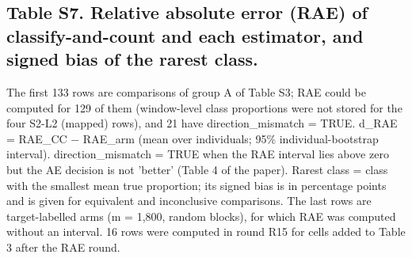 \documentclass[10pt,a4paper]{article}
\begin{document}
\subsection*{Table S7. Relative absolute error (RAE) of classify-and-count and each estimator, and signed bias of the rarest class.}
{\footnotesize The first 133 rows are comparisons of group A of Table S3; RAE could be computed for 129 of them (window-level class proportions were not stored for the four S2-L2 (mapped) rows), and 21 have direction\_mismatch = TRUE. d\_RAE = RAE\_CC $-$ RAE\_arm (mean over individuals; 95\% individual-bootstrap interval). direction\_mismatch = TRUE when the RAE interval lies above zero but the AE decision is not 'better' (Table 4 of the paper). Rarest class = class with the smallest mean true proportion; its signed bias is in percentage points and is given for equivalent and inconclusive comparisons. The last rows are target-labelled arms (m = 1,800, random blocks), for which RAE was computed without an interval. 16 rows were computed in round R15 for cells added to Table 3 after the RAE round.\par}\smallskip
\end{document}
